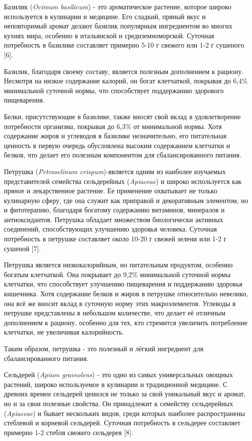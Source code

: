 \begin{multicols}{2}
Базилик (\emph{Ocimum basilicum}) - это ароматическое растение, которое
широко используется в кулинарии и медицине. Его сладкий, пряный вкус и
неповторимый аромат делают базилик популярным ингредиентом во многих
кухнях мира, особенно в итальянской и средиземноморской. Суточная
потребность в базилике составляет примерно 5-10 г свежего или 1-2 г
сушеного {[}6{]}.

Базилик, благодаря своему составу, является полезным дополнением к
рациону. Несмотря на низкое содержание калорий, он богат клетчаткой,
покрывая до 6,4\% минимальной суточной нормы, что способствует
поддержанию здорового пищеварения.

Белки, присутствующие в базилике, также вносят свой вклад в
удовлетворение потребности организма, покрывая до 6,3\% от минимальной
нормы. Хотя содержание жиров и углеводов в базилике незначительно, его
питательная ценность в первую очередь обусловлена высоким содержанием
клетчатки и белков, что делает его полезным компонентом для
сбалансированного питания\emph{.}

Петрушка (\emph{Petroselinum crispum})-является одним из наиболее
изучаемых представителей семейства сельдерейных (\emph{Apiaceae}) и
широко используется как пряное и лекарственное растение. Ее применение
охватывает не только кулинарную сферу, где она служит как приправой и
декоративным элементом, но и фитотерапию, благодаря богатому содержанию
витаминов, минералов и антиоксидантов. Петрушка обладает множеством
биологически активных соединений, способствующих улучшению здоровья
человека. Суточная потребность в петрушке составляет около 10-20 г
свежей зелени или 1-2 г сушеной {[}7{]}.

Петрушка является низкокалорийным, но питательным продуктом, особенно
богатым клетчаткой. Она покрывает до 9,2\% минимальной суточной нормы
клетчатки, что способствует улучшению пищеварения и поддержанию здоровья
кишечника. Хотя содержание белков и жиров в петрушке относительно
невелико, она всё же вносит вклад в суточную норму этих макроэлементов.
Углеводы в петрушке представлены в небольшом количестве, что делает её
отличным дополнением к рациону, особенно для тех, кто стремится
увеличить потребление клетчатки, не увеличивая калорийность.

Таким образом, петрушка - это полезный и лёгкий ингредиент для
сбалансированного питания.

Сельдерей (\emph{Apium graveolens}) - это одно из самых универсальных
овощных растений, широко используемое в кулинарии и традиционной
медицине. С древних времен сельдерей ценился не только за свой
уникальный вкус и аромат, но и за свои полезные свойства. Он принадлежит
к семейству сельдерейных (\emph{Apiaceae}) и бывает нескольких видов,
среди которых наиболее распространены стеблевой и корневой сельдерей.
Суточная потребность в сельдерее составляет примерно 1-2 стебля свежего
сельдерея {[}8{]}.


\end{multicols}
